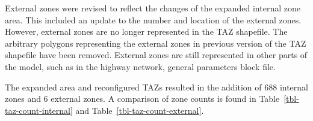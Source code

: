 \documentclass[
  letterpaper,
  DIV=11,
  numbers=noendperiod,
  titlepage=false]{scrreprt}
\begin{document}
External zones were revised to reflect the changes of the expanded
internal zone area. This included an update to the number and location
of the external zones. However, external zones are no longer represented
in the TAZ shapefile. The arbitrary polygons representing the external
zones in previous version of the TAZ shapefile have been removed.
External zones are still represented in other parts of the model, such
as in the highway network, general parameters block file.

The expanded area and reconfigured TAZs resulted in the addition of 688
internal zones and 6 external zones. A comparison of zone counts is
found in Table~\ref{tbl-taz-count-internal} and
Table~\ref{tbl-taz-count-external}.

\newpage

\begin{figure}

\begin{minipage}[t]{0.50\linewidth}

{\centering 

}
\end{minipage}
\end{figure}
\end{document}
